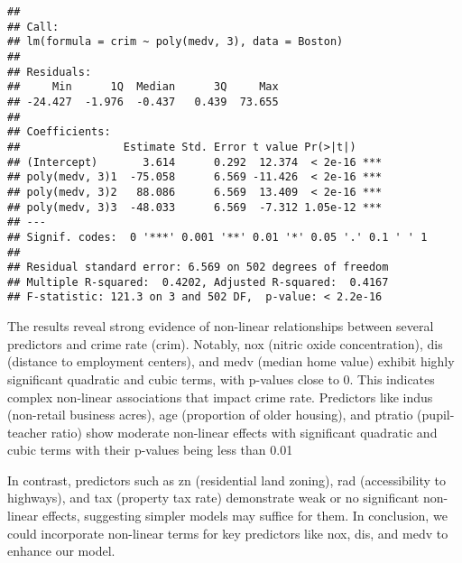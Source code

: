 \documentclass[
]{article}
\begin{document}
\begin{verbatim}
## 
## Call:
## lm(formula = crim ~ poly(medv, 3), data = Boston)
## 
## Residuals:
##     Min      1Q  Median      3Q     Max 
## -24.427  -1.976  -0.437   0.439  73.655 
## 
## Coefficients:
##                Estimate Std. Error t value Pr(>|t|)    
## (Intercept)       3.614      0.292  12.374  < 2e-16 ***
## poly(medv, 3)1  -75.058      6.569 -11.426  < 2e-16 ***
## poly(medv, 3)2   88.086      6.569  13.409  < 2e-16 ***
## poly(medv, 3)3  -48.033      6.569  -7.312 1.05e-12 ***
## ---
## Signif. codes:  0 '***' 0.001 '**' 0.01 '*' 0.05 '.' 0.1 ' ' 1
## 
## Residual standard error: 6.569 on 502 degrees of freedom
## Multiple R-squared:  0.4202, Adjusted R-squared:  0.4167 
## F-statistic: 121.3 on 3 and 502 DF,  p-value: < 2.2e-16
\end{verbatim}

The results reveal strong evidence of non-linear relationships between
several predictors and crime rate (crim). Notably, nox (nitric oxide
concentration), dis (distance to employment centers), and medv (median
home value) exhibit highly significant quadratic and cubic terms, with
p-values close to 0. This indicates complex non-linear associations that
impact crime rate. Predictors like indus (non-retail business acres),
age (proportion of older housing), and ptratio (pupil-teacher ratio)
show moderate non-linear effects with significant quadratic and cubic
terms with their p-values being less than 0.01

In contrast, predictors such as zn (residential land zoning), rad
(accessibility to highways), and tax (property tax rate) demonstrate
weak or no significant non-linear effects, suggesting simpler models may
suffice for them. In conclusion, we could incorporate non-linear terms
for key predictors like nox, dis, and medv to enhance our model.
\end{document}
